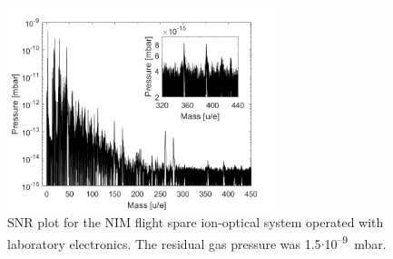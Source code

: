 		\begin{figure}[h]
			\centering
			\includegraphics[width = 0.7\textwidth]{Experiments/FSLabSNRRestGasPressCal.png}
			\caption{SNR plot for the NIM flight spare ion-optical system operated with laboratory electronics. The residual gas pressure was 1.5$\cdot$10\textsuperscript{--9}~mbar.}
			\label{fig:ExpFSFlightSenSNR}
		\end{figure}
